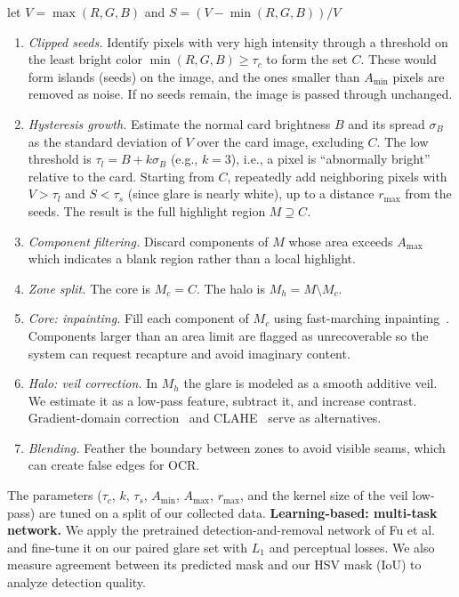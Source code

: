 \documentclass{article}
\begin{document}
let $V=\max(R,G,B)$ and $S=(V-\min(R,G,B))/V$

\begin{enumerate}
\item \emph{Clipped seeds.}
Identify pixels with very high intensity through a threshold on the least bright color $\min(R,G,B)\ge\tau_c$ to form the set $C$. These would form islands (seeds) on the image, and the ones smaller than $A_{\min}$ pixels are removed as noise. If no seeds remain, the image is passed through unchanged.
\item \emph{Hysteresis growth.} Estimate the normal card brightness $B$ and its spread $\sigma_B$ as the standard deviation of $V$ over the card image, excluding $C$. The low threshold is $\tau_l = B + k\sigma_B$ (e.g., $k=3$), i.e., a pixel is ``abnormally bright'' relative to the card. Starting from $C$, repeatedly add neighboring pixels with $V>\tau_l$ and $S<\tau_s$ (since glare is nearly white), up to a distance $r_{\max}$ from the seeds. The result is the full highlight region $M \supseteq C$.
\item \emph{Component filtering.} Discard components of $M$ whose area exceeds $A_{\max}$ which indicates a blank region rather than a local highlight.
\item \emph{Zone split.} The core is $M_c = C$. The halo is $M_h = M \setminus M_c$.
\item \emph{Core: inpainting.} Fill each component of $M_c$ using fast-marching inpainting~\cite{telea2004}. Components larger than an area limit are flagged as unrecoverable so the system can request recapture and avoid imaginary content.
\item \emph{Halo: veil correction.} In $M_h$ the glare is modeled as a smooth additive veil. We estimate it as a low-pass feature, subtract it, and increase contrast. Gradient-domain correction~\cite{perez2003} and CLAHE~\cite{zuiderveld1994} serve as alternatives.
\item \emph{Blending.} Feather the boundary between zones to avoid visible seams, which can create false edges for OCR.
\end{enumerate}
The parameters ($\tau_c$, $k$, $\tau_s$, $A_{\min}$, $A_{\max}$, $r_{\max}$, and the kernel size of the veil low-pass) are tuned on a split of our collected data.
\textbf{Learning-based: multi-task network.} We apply the pretrained detection-and-removal network of Fu et al.~\cite{fu2021} and fine-tune it on our paired glare set with $L_1$ and perceptual losses. We also measure agreement between its predicted mask and our HSV mask (IoU) to analyze detection quality.
\end{document}
